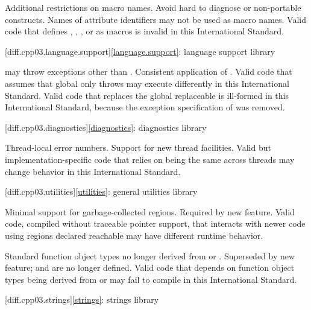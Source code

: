 \change
Additional restrictions on macro names.
\rationale
Avoid hard to diagnose or non-portable constructs.
\effect
Names of attribute identifiers may not be used as macro names. Valid \CppIII{}
code that defines , ,
, or  as macros is invalid in this
International Standard.

[diff.cpp03.language.support]{\ref{language.support}:
language support library}

\change
{} may throw exceptions other than
.
\rationale
Consistent application of .
\effect
Valid \CppIII{} code that assumes that global  only
throws  may execute differently in this International
Standard.
Valid \CppIII{} code that replaces the global replaceable 
is ill-formed in this International Standard,
because the exception specification of 
was removed.

[diff.cpp03.diagnostics]{\ref{diagnostics}: diagnostics library}

\change
Thread-local error numbers.
\rationale
Support for new thread facilities.
\effect
Valid but implementation-specific \CppIII{} code that relies on
 being the same across threads may change behavior in this
International Standard.

[diff.cpp03.utilities]{\ref{utilities}: general utilities library}

\change
Minimal support for garbage-collected regions.
\rationale
Required by new feature.
\effect
Valid \CppIII{} code, compiled without traceable pointer support,
that interacts with newer \Cpp{} code using regions declared reachable may
have different runtime behavior.

\change
Standard function object types no longer derived from
 or .
\rationale
Superseded by new feature;  and
 are no longer defined.
\effect
Valid \CppIII{} code that depends on function object types being derived from
 or  may fail to compile
in this International Standard.

[diff.cpp03.strings]{\ref{strings}: strings library}

